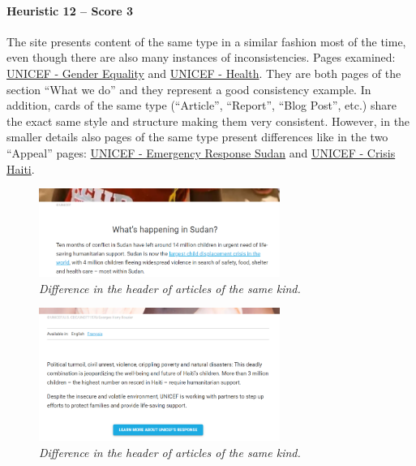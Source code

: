 \newpage

\paragraph*{Heuristic 12 – Score 3}
The site presents content of the same type in a similar fashion most of the time, even though there are also many instances of inconsistencies.
Pages examined: \href{https://www.unicef.org/gender-equality}{UNICEF - Gender Equality} and \href{https://www.unicef.org/health}{UNICEF - Health}. They are both pages of the section “What we do” and they represent a good consistency example. In addition, cards of the same type (“Article”, “Report”, “Blog Post”, etc.) share the exact same style and structure making them very consistent.
However, in the smaller details also pages of the same type present differences like in the two “Appeal” pages: \href{https://www.unicef.org/emergencies/emergency-response-sudan}{UNICEF - Emergency Response Sudan} and \href{https://www.unicef.org/emergencies/crisis-haiti}{UNICEF - Crisis Haiti}.
\begin{figure}[h]
	\centering
	\begin{center}
		\includegraphics[width=0.7\textwidth]{Picture17.png}
	\end{center}
	\captionsetup{font=small}
	\caption{\textit{Difference in the header of articles of the same kind.}}
	\label{fig:label17}
\end{figure}
\begin{figure}[h]
	\centering
	\begin{center}
		\includegraphics[width=0.7\textwidth]{Picture18.png}
	\end{center}
	\captionsetup{font=small}
	\caption{\textit{Difference in the header of articles of the same kind.}}
	\label{fig:label18}
\end{figure}

